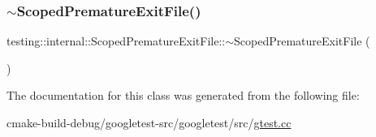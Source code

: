 \mbox{\label{classtesting_1_1internal_1_1ScopedPrematureExitFile_afa2ddc9bc1c2a90fd0dd82bb11fddc79}} 
\subsubsection{\texorpdfstring{$\sim$ScopedPrematureExitFile()}{~ScopedPrematureExitFile()}}
{\footnotesize\ttfamily testing\+::internal\+::\+Scoped\+Premature\+Exit\+File\+::$\sim$\+Scoped\+Premature\+Exit\+File (\begin{DoxyParamCaption}{ }\end{DoxyParamCaption})\hspace{0.3cm}{\ttfamily [inline]}}



The documentation for this class was generated from the following file\+:\begin{DoxyCompactItemize}
\item 
cmake-\/build-\/debug/googletest-\/src/googletest/src/\mbox{\hyperlink{gtest_8cc}{gtest.\+cc}}\end{DoxyCompactItemize}
